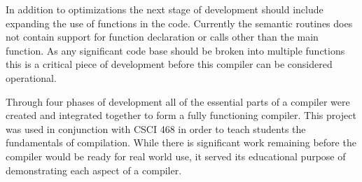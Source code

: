 \documentclass[12pt]{article}
\begin{document}
            In addition to optimizations the next stage of development should include expanding the use of functions in the code.  Currently the semantic routines does not contain support for function declaration or calls other than the main function.  As any significant code base should be broken into multiple functions this is a critical piece of development before this compiler can be considered operational.
            
            Through four phases of development all of the essential parts of a compiler were created and integrated together to form a fully functioning compiler.  This project was used in conjunction with CSCI 468 in order to teach students the fundamentals of compilation.  While there is significant work remaining before the compiler would be ready for real world use, it served its educational purpose of demonstrating each aspect of a compiler.
    
 
\end{document}
